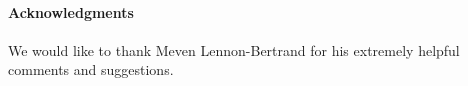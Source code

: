 
\paragraph*{\textbf{Acknowledgments}} We would like to thank Meven
Lennon-Bertrand for his extremely helpful comments and suggestions. 
